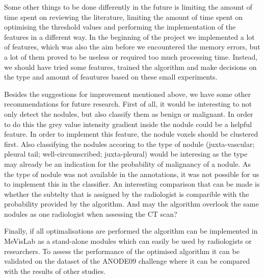 Some other things to be done differently in the future is limiting the amount
of time spent on reviewing the literature, limiting the amount of time spent
on optimising the threshold values and performing the implementation of the
features in a different way. In the beginning of the project we implemented a
lot of features, which was also the aim before we encountered the memory
errors, but a lot of them proved to be useless or required too much processing
time. Instead, we should have tried some features, trained the algorithm and
make decisions on the type and amount of feautures based on these small
experiments.

Besides the suggestions for improvement mentioned above, we have some other
recommendations for future research. First of all, it would be interesting to
not only detect the nodules, but also classify them as benign or malignant. In
order to do this the grey value intensity gradient inside the nodule could be a
helpful feature. In order to implement this feature, the nodule voxels should be
clustered first. Also classifying the nodules accoring to the type of nodule
(juxta-vascular; pleural tail; well-circumscribed; juxta-pleural) would be
interesing as the type may already be an indication for the probability of
malignancy of a nodule. As the type of nodule was not available in the
annotations, it was not possible for us to implement this in the classifier.
An interesting comparison that can be made is whether the subtelty
that is assigned by the radiologist is comparible with the probability provided
by the algorithm. And may the algorithm overlook the same nodules as one
radiologist when assessing the CT scan?

Finally, if all optimalisations are performed the algorithm can be implemented
in MeVisLab as a stand-alone modules which can easily be used by radiologists or
researchers. To assess the performance of the optimised algorithm it can be
validated on the dataset of the ANODE09 challenge where it can be compared with
the results of other studies.